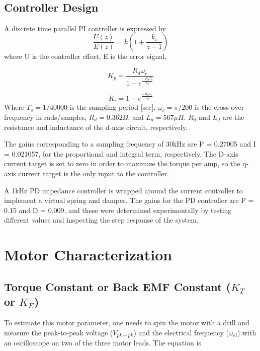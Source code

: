 \documentclass{article}
\begin{document}
\subsection{Controller Design}

A discrete time parallel PI controller is expressed by
\begin{equation}
    \frac{U(z)}{E(z)} = k\left( 1+\frac{k_i}{z-1}\right)
\end{equation}
where U is the controller effort, E is the error signal, 

\begin{equation}
    K_{p} = \frac{R_d \omega_c}{1-e^{\frac{-R_d T_s}{L_d}}}
\end{equation}

\begin{equation}
    K_{i} = 1-e^{\frac{-R_d T_s}{L_d}}
\end{equation}
Where $T_s = 1/40000$ is the sampling period [sec], $\omega_c = \pi/200$ is the cross-over frequency in rads/samples, $R_d = 0.362\Omega$, and $L_d = 567 \mu H$. $R_d$ and $L_d$ are the resistance and inductance of the d-axis circuit, respectively.\newline

The gains corresponding to a sampling frequency of 30kHz are P = 0.27005 and I = 0.021057, for the proportional and integral term, respectively. The D-axis current target is set to zero in order to maximize the torque per amp, so the q-axis current target is the only input to the controller.

A 1kHz PD impedance controller is wrapped around the current controller to implement a virtual spring and damper. The gains for the PD controller are P = 0.15 and D = 0.009, and these were determined experimentally by testing different values and inspecting the step response of the system.

\vspace{5mm} %

\section{Motor Characterization}
\subsection{Torque Constant or Back EMF Constant ($K_T$ or $K_E$)}

To estimate this motor parameter, one needs to spin the motor with a drill and measure the peak-to-peak voltage ($V_{pk-pk}$) and the electrical frequency ($\omega_{el}$) with an oscilloscope on two of the three motor leads. The equation is
\end{document}

